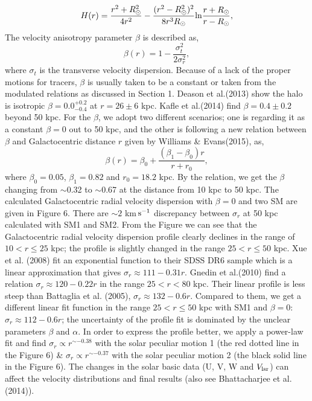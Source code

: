 \documentclass[12pt,preprint]{aastex}
\begin{document}
\begin{equation}
H(r) = \frac{r^2 + {R^2_\odot}}{4r^2} - \frac{(r^2 - {R^2_\odot})^2}{8r^3R_\odot}{\rm ln}{\frac{r + R_\odot}{r - R_\odot}},
\end{equation}
The velocity anisotropy parameter $\beta$ is described as,
\begin{equation}
\beta(r) = 1 - \frac{\sigma^2_t}{2{\sigma}^2_r} ,
\end{equation}
where $\sigma_t$ is the transverse velocity dispersion. Because of a lack of the proper motions for tracers, $\beta$ is usually taken to be a constant or taken from the modulated relations as discussed in Section 1. Deason et al.(2013) show the halo is isotropic $\beta = 0.0^{+0.2}_{-0.4}$ at $r = 26\pm6$ kpc.  Kafle et al.(2014) find $\beta = 0.4\pm0.2$ beyond 50 kpc.  For the $\beta$, we adopt two different scenarios; one is regarding it as a constant $\beta = 0$ out to 50 kpc, and the other is following  a new relation between $\beta$ and Galactocentric distance $r$ given by Williams \& Evans(2015), as,
\begin{equation}
\beta(r) = \beta_0 + \frac{(\beta_1 - \beta_0)r}{r + r_0} ,
\end{equation}
where $\beta_0 = 0.05$, $\beta_1 = 0.82$ and $r_0 = 18.2$ kpc. By the relation, we get the $\beta$ changing from $\sim$0.32 to $\sim$0.67 at the distance from 10 kpc to 50 kpc.  The calculated Galactocentric radial velocity dispersion with $\beta = 0$ and two SM are given in Figure 6. There are $\sim 2$ km$\,\rm s^{-1}$ discrepancy  between $\sigma_{r}$ at 50 kpc calculated with SM1 and SM2. From the Figure we can see that the Galactocentric radial velocity dispersion profile clearly declines in the range of $10 < r \leq 25$ kpc; the profile is slightly changed in the range $25 < r \leq 50$ kpc. Xue et al. (2008) fit an exponential function to their SDSS DR6 sample which is a linear approximation that gives $\sigma_{r} \approx 111 - 0.31r$. Gnedin et al.(2010) find a relation $\sigma_{r} \approx 120 - 0.22r$ in the range $25 < r < 80$ kpc. Their linear profile is less steep than Battaglia et al. (2005), $\sigma_{r} \approx 132 - 0.6r$. Compared to them, we get a different linear fit function in the range $25 < r \leq 50$ kpc with SM1 and $\beta=0$: $\sigma_{r} \approx 112 - 0.6r$; the uncertainty of the profile fit is dominated by the unclear parameters $\beta$ and $\alpha$. In order to express the profile better, we apply a power-law fit and find $\sigma_r \propto r^{\sim-0.38}$ with the solar peculiar motion 1 (the red dotted line in the Figure 6) \& $\sigma_r \propto r^{\sim-0.37}$ with the solar peculiar motion 2 (the black solid line in the Figure 6). The changes in the solar basic data (U, V, W and $V_{\rm lsr}$) can affect the velocity distributions and final results (also see Bhattacharjee et al.(2014)).
\end{document}
